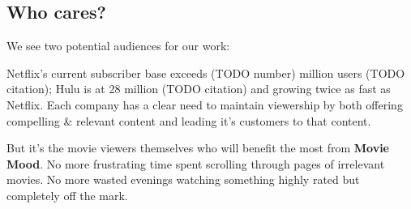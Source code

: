 
\subsection{Who cares?}

We see two potential audiences for our work:

Netflix's current subscriber base exceeds (TODO number) million users (TODO citation); Hulu is at 28 million (TODO citation) and growing twice as fast as Netflix.    Each company has a clear need to maintain viewership by both offering compelling \& relevant content and leading it's customers to that content.

But it's the movie viewers themselves who will benefit the most from \textbf{Movie Mood}.  No more frustrating time spent scrolling through pages of irrelevant movies.   No more wasted evenings watching something highly rated but completely off the mark.
